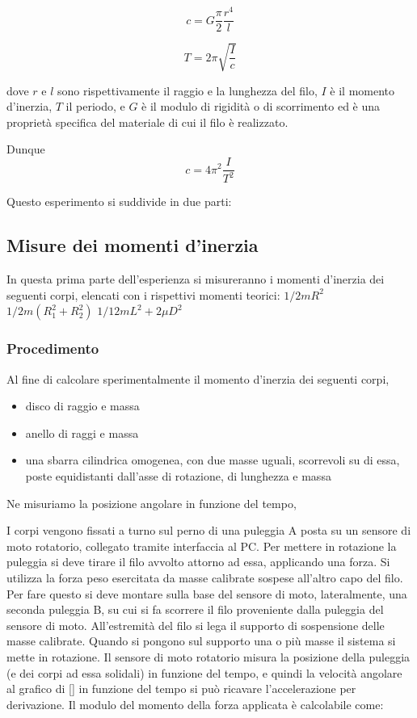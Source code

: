 \documentclass[a4paper,10pt]{report}
\begin{document}
$$ c = G \frac{\pi}{2}\frac{r^4}{l} $$

$$ T = 2\pi \sqrt{\frac{I}{c}}$$


dove $r$ e $l$ sono rispettivamente il raggio e la lunghezza del filo, $I$ è il momento d'inerzia, $T$ il periodo, e $G$ è il modulo di rigidità o di scorrimento ed è una proprietà specifica del materiale di cui il filo è realizzato.

Dunque
$$ c = 4\pi^2\frac{I}{T^2} $$

Questo esperimento si suddivide in due parti:
\subsection{Misure dei momenti d'inerzia}
In questa prima parte dell'esperienza si misureranno i momenti d'inerzia dei seguenti corpi, elencati con i rispettivi momenti teorici:
$ 1/2 m R^2 $
$ 1/2 m (R^2_1 + R^2_2) $
$ 1/12 m L^2 + 2 \mu D^2  $
\subsubsection*{Procedimento}
Al fine di calcolare sperimentalmente il momento d'inerzia dei seguenti corpi,
\begin{itemize}
\item disco di raggio e massa
\item anello di raggi e massa
\item una sbarra cilindrica omogenea, con due masse uguali, scorrevoli su di essa, poste equidistanti dall’asse di rotazione, di lunghezza e massa
\end{itemize}



Ne misuriamo la posizione angolare in funzione del tempo, 

I corpi vengono fissati a turno sul perno di una puleggia A posta su un sensore di moto rotatorio, collegato tramite interfaccia al PC. Per mettere in rotazione la puleggia si deve tirare il filo avvolto attorno ad essa, applicando una forza. Si utilizza la forza peso esercitata da masse calibrate sospese all’altro capo del filo. Per fare questo si deve montare sulla base del sensore di moto, lateralmente, una seconda puleggia B, su cui si fa scorrere il filo proveniente dalla puleggia del sensore di moto. All'estremità del filo si lega il supporto di sospensione delle masse calibrate.
Quando si pongono sul supporto una o più masse il sistema si mette in rotazione. Il sensore di moto rotatorio misura la posizione della puleggia (e dei corpi ad essa solidali) in funzione del tempo, e quindi la velocità angolare  al grafico di [] in funzione del tempo si può ricavare l’accelerazione  per derivazione.
Il modulo del momento della forza applicata è calcolabile come:
\end{document}
